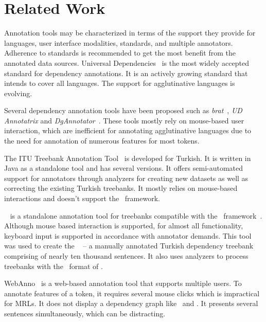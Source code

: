\section{Related Work}
\label{sec:related}

Annotation tools may be characterized in terms of the support they provide for languages, user interface modalities, standards, and multiple annotators.
Adherence to standards is recommended to get the most benefit from the annotated data sources.
Universal Dependencies~\cite{UD} is the most widely accepted standard for dependency annotations.
It is an actively growing standard that intends to cover all languages.
The support for agglutinative languages is evolving.

Several dependency annotation tools have been proposed such as \textit{brat}~\cite{brat}, \textit{UD Annotatrix} and \textit{DgAnnotator}~\cite{UD-tools}.
These tools mostly rely on mouse-based user interaction, which are inefficient for annotating agglutinative languages due to the need for annotation of numerous features for most tokens.

The ITU Treebank Annotation Tool~\cite{pamay-etal-2015-annotation} is developed for Turkish.
It is written in Java as a standalone tool and has several versions.
It offers semi-automated support for annotators through analyzers for creating new datasets as well as correcting the existing Turkish treebanks.
It mostly relies on mouse-based interactions and doesn't support the \ud\ framework.

\boatvone~\cite{turk-etal-2019-turkish} is a standalone annotation tool for treebanks compatible with the \ud\ framework~\cite{UD}.
Although mouse based interaction is supported, for almost all functionality, keyboard input is supported in accordance with annotator demands.
This tool was used to create the \bountreebank~\cite{turk2021resources,UD-Boun-Treebank} -- a manually annotated Turkish dependency treebank comprising of nearly ten thousand sentences.
It also uses analyzers to process treebanks with the \conllu\ format of \ud.

WebAnno~\cite{webanno} is a web-based annotation tool that supports multiple users. 
To annotate features of a token, it requires several mouse clicks which is impractical for MRLs.
It does not display a dependency graph like \boatvone\ and \boatvtwo. 
It presents several sentences simultaneously, which can be distracting.

